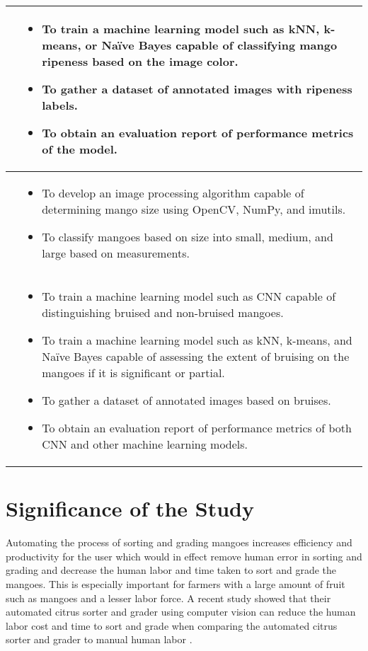 \begin{center}
{\begin{longtable}{p{}|p{}}
			\Paste{SO5} & \begin{itemize}
				\item To train a machine learning model such as kNN, k-means, or Naïve Bayes capable
				of classifying mango ripeness based on the image color.
				\item To gather a dataset of annotated images with ripeness labels.
				\item To obtain an evaluation report of performance metrics of the model.
			\end{itemize} \\ \hline
			
			\Paste{SO6} & \begin{itemize}
				\item To develop an image processing algorithm capable of determining mango 
				size using OpenCV, NumPy, and imutils.
				\item To classify mangoes based on size into small, medium, and large based on measurements.
			\end{itemize} \\ \hline
			
			\Paste{SO7} & \begin{itemize}
				\item To train a machine learning model such as 
				CNN capable of distinguishing bruised and non-bruised mangoes.
				\item To train a machine learning model such as kNN, k-means, and Naïve Bayes 
				capable of assessing the extent of bruising on the mangoes if it is significant or partial.
				\item To gather a dataset of annotated images based on bruises.
				\item To obtain an evaluation report of performance metrics of both CNN and other machine learning models.
			\end{itemize} \\ \hline
			
		\end{longtable}
	}
\end{center}


\section{Significance of the Study}

Automating the process of sorting and grading mangoes increases efficiency and
productivity for the user which would in effect remove human error in sorting
and grading and decrease the human labor and time taken to sort and grade the
mangoes.  This is especially important for farmers with a large amount of fruit
such as mangoes and a lesser labor force. A recent study showed that their
automated citrus sorter and grader using computer vision can reduce the human
labor cost and time to sort and grade when comparing the automated citrus sorter
and grader to manual human labor \cite{chakraborty-development-2023}. 

